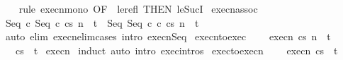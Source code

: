 \begin{isabellebody}
%
\isadelimproof
\ \ %
\endisadelimproof
%
\isatagproof
{}\isamarkupfalse%
\ {\isacharparenleft}rule\ execn{\isacharunderscore}mono\ {\isacharbrackleft}OF\ {\isacharunderscore}\ le{\isacharunderscore}refl\ {\isacharbrackleft}THEN\ le{\isacharunderscore}SucI{\isacharbrackright}{\isacharbrackright}{\isacharparenright}%
\endisatagproof
{\isafoldproof}%
%
\isadelimproof
\isanewline
%
\endisadelimproof
\isanewline
{}\isamarkupfalse%
\ execn{\isacharunderscore}assoc{\isacharcolon}\ \isanewline
\ {\isachardoublequoteopen}{\isasymGamma}{\isasymturnstile}{\isasymlangle}Seq\ c{}\ {\isacharparenleft}Seq\ c{}\ c{}{\isacharparenright}{\isacharcomma}s{\isasymrangle}\ {\isacharequal}n{\isasymRightarrow}\ \ t\ {\isacharequal}\ {\isasymGamma}{\isasymturnstile}{\isasymlangle}Seq\ {\isacharparenleft}Seq\ c{}\ c{}{\isacharparenright}\ c{}{\isacharcomma}s{\isasymrangle}\ {\isacharequal}n{\isasymRightarrow}\ \ t{\isachardoublequoteclose}\isanewline
%
\isadelimproof
\ \ %
\endisadelimproof
%
\isatagproof
{}\isamarkupfalse%
\ {\isacharparenleft}auto\ elim{\isacharbang}{\isacharcolon}\ execn{\isacharunderscore}elim{\isacharunderscore}cases\ intro{\isacharcolon}\ execn{\isacharunderscore}Seq{\isacharprime}{\isacharparenright}%
\endisatagproof
{\isafoldproof}%
%
\isadelimproof
\isanewline
%
\endisadelimproof
\isanewline
\isanewline
{}\isamarkupfalse%
\ execn{\isacharunderscore}to{\isacharunderscore}exec{\isacharcolon}\ \isanewline
\ \ \ execn{\isacharcolon}\ {\isachardoublequoteopen}{\isasymGamma}{\isasymturnstile}{\isasymlangle}c{\isacharcomma}s{\isasymrangle}\ {\isacharequal}n{\isasymRightarrow}\ \ t{\isachardoublequoteclose}\isanewline
\ \ \ {\isachardoublequoteopen}{\isasymGamma}{\isasymturnstile}{\isasymlangle}c{\isacharcomma}s{\isasymrangle}\ {\isasymRightarrow}\ t{\isachardoublequoteclose}\isanewline
%
\isadelimproof
%
\endisadelimproof
%
\isatagproof
{}\isamarkupfalse%
\ execn\isanewline
{}\isamarkupfalse%
\ induct\ {\isacharparenleft}auto\ intro{\isacharcolon}\ exec{\isachardot}intros{\isacharparenright}%
\endisatagproof
{\isafoldproof}%
%
\isadelimproof
\isanewline
%
\endisadelimproof
\isanewline
{}\isamarkupfalse%
\ exec{\isacharunderscore}to{\isacharunderscore}execn{\isacharcolon}\ \isanewline
\ \ \ execn{\isacharcolon}\ {\isachardoublequoteopen}{\isasymGamma}{\isasymturnstile}{\isasymlangle}c{\isacharcomma}s{\isasymrangle}\ {\isasymRightarrow}\ t{\isachardoublequoteclose}\isanewline

\end{isabellebody}
